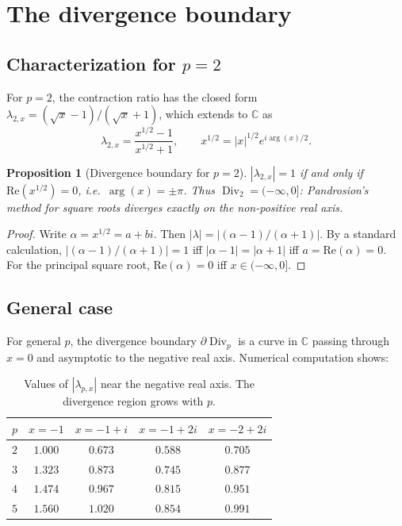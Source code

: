 \documentclass[10pt,a4paper,oneside]{book}
\newtheorem{proposition}[theorem]{Proposition}
\theoremstyle{definition}
\theoremstyle{remark}
\newcommand{\CC}{\mathbb{C}}
\DeclareMathOperator{\Div}{Div}
\begin{document}
\section{The divergence boundary}
\label{sec:divergence}

\subsection{Characterization for \texorpdfstring{$p = 2$}{p=2}}

For $p = 2$, the contraction ratio has the closed form $\lambda_{2,x} = (\sqrt{x} - 1)/(\sqrt{x} + 1)$, which extends to $\CC$ as
\[
  \lambda_{2,x} = \frac{x^{1/2} - 1}{x^{1/2} + 1},
  \qquad x^{1/2} = |x|^{1/2} e^{i\arg(x)/2}.
\]

\begin{proposition}[Divergence boundary for $p = 2$]
\label{prop:div_p2}
$|\lambda_{2,x}| = 1$ if and only if $\mathrm{Re}(x^{1/2}) = 0$, i.e.\ $\arg(x) = \pm \pi$.  Thus $\Div_2 = (-\infty, 0]$: Pandrosion's method for square roots diverges exactly on the non-positive real axis.
\end{proposition}

\begin{proof}
Write $\alpha = x^{1/2} = a + bi$.  Then $|\lambda| = |(\alpha-1)/(\alpha+1)|$.  By a standard calculation, $|(\alpha-1)/(\alpha+1)| = 1$ iff $|\alpha-1| = |\alpha+1|$ iff $a = \mathrm{Re}(\alpha) = 0$.  For the principal square root, $\mathrm{Re}(\alpha) = 0$ iff $x \in (-\infty, 0]$.
\end{proof}

\subsection{General case}

For general $p$, the divergence boundary $\partial \Div_p$ is a curve in $\CC$ passing through $x = 0$ and asymptotic to the negative real axis.  Numerical computation shows:

\begin{table}[h]
\centering
\begin{tabular}{ccccc}
\toprule
$p$ & $x=-1$ & $x=-1+i$ & $x=-1+2i$ & $x=-2+2i$ \\
\midrule
$2$ & $1.000$ & $0.673$ & $0.588$ & $0.705$ \\
$3$ & $1.323$ & $0.873$ & $0.745$ & $0.877$ \\
$4$ & $1.474$ & $0.967$ & $0.815$ & $0.951$ \\
$5$ & $1.560$ & $1.020$ & $0.854$ & $0.991$ \\
\bottomrule
\end{tabular}
\caption{Values of $|\lambda_{p,x}|$ near the negative real axis.  The divergence region grows with $p$.}
\label{tab:divergence}
\end{table}
\end{document}
